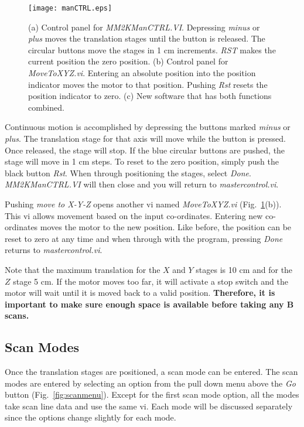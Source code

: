 \documentclass[10pt]{article}
\begin{document}
\begin{figure}[htb]
\begin{center}
\texttt{[image: manCTRL.eps]}
 \caption{(a) Control panel for {\it MM2KManCTRL.VI}. Depressing
 {\it minus} or {\it plus} moves the translation stages until the
 button is released. The circular buttons move the stages in 1 cm
 increments. {\it RST} makes the current position the zero position.
 (b) Control panel for {\it MoveToXYZ.vi}. Entering an absolute
 position into the position indicator moves the motor to that position.
 Pushing {\it Rst} resets the position indicator to zero. (c) New software
 that has both functions combined.}
 \label{fig:manCTRL}
\end{center}
\end{figure}

Continuous motion is accomplished by depressing the buttons marked
{\it minus} or {\it plus}. The translation stage for that axis
will move while the button is pressed. Once released, the stage
will stop. If the blue circular buttons are pushed, the stage will
move in 1 cm steps. To reset to the zero position, simply push the
black button {\it Rst}. When through positioning the stages,
select {\it Done}. {\it MM2KManCTRL.VI} will then close and you
will return to {\it mastercontrol.vi}.

Pushing {\it move to X-Y-Z} opens another vi named  {\it
MoveToXYZ.vi} (Fig.~\ref{fig:manCTRL}(b)). This vi allows movement
based on the input co-ordinates. Entering new co-ordinates moves
the motor to the new position. Like before, the position can be
reset to zero at any time and when through with the program,
pressing {\it Done} returns to {\it mastercontrol.vi}.

Note that the maximum translation for the $X$ and $Y$ stages is 10
cm and for the $Z$ stage 5 cm. If the motor moves too far, it will
activate a stop switch and the motor will wait until it is moved
back to a valid position. {\bf Therefore, it is important to make
sure enough space is available before taking any B scans.}

\subsection{Scan Modes}

Once the translation stages are positioned, a scan mode can be
entered. The scan modes are entered by selecting an option from
the pull down menu above the {\it Go} button
(Fig.~\ref{fig:scanmenu}). Except for the first scan mode option,
all the modes take scan line data and use the same vi. Each mode
will be discussed separately since the options change slightly for
each mode.
\end{document}
